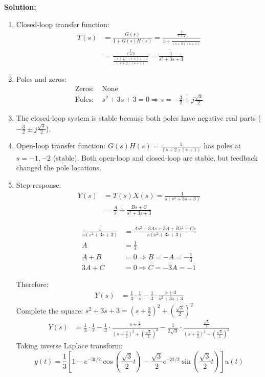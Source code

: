 \documentclass{article}
\begin{document}
\textbf{Solution:}
\begin{enumerate}[label=(\alph*)]
    \item Closed-loop transfer function:
    \begin{align*}
        T(s) &= \frac{G(s)}{1 + G(s)H(s)} = \frac{\frac{1}{s+2}}{1 + \frac{1}{(s+2)(s+1)}} \\
        &= \frac{\frac{1}{s+2}}{\frac{(s+2)(s+1) + 1}{(s+2)(s+1)}} = \frac{1}{s^2 + 3s + 3}
    \end{align*}
    
    \item Poles and zeros:
    \begin{align*}
        \text{Zeros: } & \text{None} \\
        \text{Poles: } & s^2 + 3s + 3 = 0 \Rightarrow s = -\frac{3}{2} \pm j\frac{\sqrt{3}}{2}
    \end{align*}
    
    \item The closed-loop system is stable because both poles have negative real parts ($-\frac{3}{2} \pm j\frac{\sqrt{3}}{2}$).
    
    \item Open-loop transfer function: $G(s)H(s) = \frac{1}{(s+2)(s+1)}$ has poles at $s = -1, -2$ (stable). Both open-loop and closed-loop are stable, but feedback changed the pole locations.
    
    \item Step response:
    \begin{align*}
        Y(s) &= T(s)X(s) = \frac{1}{s(s^2 + 3s + 3)} \\
        &= \frac{A}{s} + \frac{Bs + C}{s^2 + 3s + 3}
    \end{align*}
	
	\begin{align*}
		\frac{1}{s(s^2 + 3s + 3)} & = \frac{As^2 + 3As + 3A + Bs^2 + Cs}{s(s^2 + 3s + 3)}\\
		A & = \frac{1}{3}\\
		A + B & = 0 \Rightarrow B = -A = -\frac{1}{3}\\
		3A + C & = 0 \Rightarrow C = -3A = -1
	\end{align*}	    
    
    Therefore:
    \begin{align*}
        Y(s) &= \frac{1}{3} \cdot \frac{1}{s} - \frac{1}{3} \cdot \frac{s + 3}{s^2 + 3s + 3}
    \end{align*}
    Complete the square: $s^2 + 3s + 3 = (s + \frac{3}{2})^2 + (\frac{\sqrt{3}}{2})^2$
    \begin{align*}
        Y(s) &= \frac{1}{3} \cdot \frac{1}{s} - \frac{1}{3} \cdot \frac{s + \frac{3}{2}}{(s + \frac{3}{2})^2 + (\frac{\sqrt{3}}{2})^2} - \frac{1}{2\sqrt{3}} \cdot \frac{\frac{\sqrt{3}}{2}}{(s + \frac{3}{2})^2 + (\frac{\sqrt{3}}{2})^2}
    \end{align*}
    Taking inverse Laplace transform:
    \[ y(t) = \frac{1}{3}[1 - e^{-3t/2}\cos(\frac{\sqrt{3}}{2}t) - \frac{\sqrt{3}}{2}e^{-3t/2}\sin(\frac{\sqrt{3}}{2}t)]u(t) \]
\end{enumerate}
\end{document}
